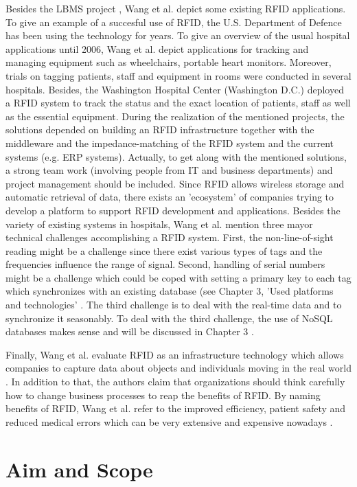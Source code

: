 Besides the LBMS project \cite[p.2 ff.]{casestudy}, Wang et al. depict some existing RFID applications. To give an example of a succesful use of RFID, the U.S. Department of Defence has been using the technology for years. 
To give an overview of the usual hospital applications until 2006, Wang et al. depict applications for tracking and managing equipment such as wheelchairs, portable heart monitors. Moreover, trials on tagging patients, staff and equipment in rooms were conducted in several hospitals. Besides, the Washington Hospital Center (Washington D.C.) deployed a RFID system to track the status and the exact location of patients, staff as well as the essential equipment.
During the realization of the mentioned projects, the solutions depended on building an RFID infrastructure together with the middleware and the impedance-matching of the RFID system and the current systems (e.g. \ac{ERP} systems). Actually, to get along with the mentioned solutions, a strong team work (involving people from IT and business departments) and project management should be included. 
Since RFID allows wireless storage and automatic retrieval of data, there exists an 'ecosystem' of companies trying to develop a platform to support RFID development and applications.  Besides the variety of existing systems in hospitals, Wang et al. mention three mayor technical challenges accomplishing a RFID system. First, the non-line-of-sight reading might be a challenge since there exist various types of tags and the frequencies influence the range of signal. Second, handling of serial numbers might be a challenge which could be coped with setting a primary key to each tag which synchronizes with an existing database (see Chapter 3, 'Used platforms and technologies' \pageref{platforms}. The third challenge is to deal with the real-time data and to synchronize it seasonably. To deal with the third challenge, the use of NoSQL databases makes sense and will be discussed in Chapter 3 \pageref{nosql}.

Finally, Wang et al. evaluate RFID as an infrastructure technology which allows companies to capture data about objects and individuals moving in the real world \cite[p.7]{casestudy}. In addition to that, the authors claim that organizations should think carefully how to change business processes to reap the benefits of RFID. By naming benefits of RFID, Wang et al. refer to the improved efficiency, patient safety and reduced medical errors which can be very extensive and expensive nowadays \cite{casestudy}.

\section{Aim and Scope}

